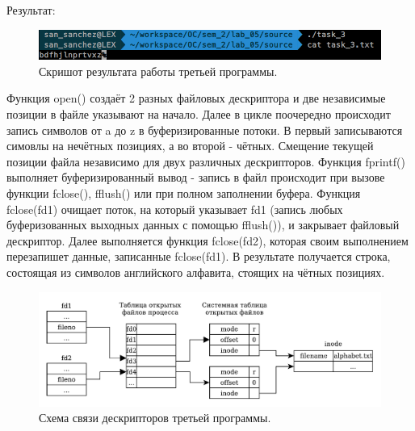 Результат:
\begin{figure}[H]
    \centering
    \includegraphics[scale=0.5]{data/image/task_3.png}
    \caption{Скришот результата работы третьей программы.}
\end{figure}

Функция open() создаёт 2 разных файловых дескриптора и две независимые позиции в файле указывают на начало.
Далее в цикле поочередно происходит запись символов от a до z в буферизированные потоки. В первый записываются симовлы на нечётных позициях, а во второй - чётных. Смещение текущей позиции файла независимо для двух различных дескрипторов.
Функция fprintf() выполняет буферизированный вывод - запись в файл происходит при вызове функции fclose(), fflush() или при полном заполнении буфера.
Функция fclose(fd1) очищает поток, на который указывает fd1 (запись любых буферизованных выходных данных с помощью fflush()), и закрывает файловый дескриптор.
Далее выполняется функция fclose(fd2), которая своим выполнением перезапишет данные, записанные fclose(fd1).
В результате получается строка, состоящая из символов английского алфавита, стоящих на чётных позициях.

\begin{figure}[H]
    \centering
    \includegraphics[scale=0.75]{data/pdf/task_3.pdf}
    \caption{Схема связи дескрипторов третьей программы.}
\end{figure}

